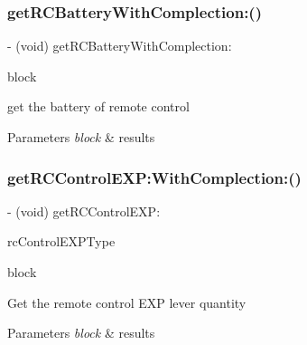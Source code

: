 \subsubsection{\texorpdfstring{get\+R\+C\+Battery\+With\+Complection\+:()}{getRCBatteryWithComplection:()}}
{\footnotesize\ttfamily -\/ (void) get\+R\+C\+Battery\+With\+Complection\+: \begin{DoxyParamCaption}\item[{(void($^\wedge$)(N\+S\+Integer battery, N\+S\+Error $\ast$\hyperlink{group___p_v_s_d_k___c_o_r_e___a_p_i___m_o_u_n_t_c_o_n_t_r_o_l_ga5a1de33b230662127568783314b4a54d}{\+\_\+\+Nullable} error))}]{block }\end{DoxyParamCaption}}

get the battery of remote control


\begin{DoxyParams}{Parameters}
{\em block} & results \\
\hline
\end{DoxyParams}
\mbox{\label{interface_p_v_remote_controller_ae939de42b3f4fbf4fe8f15f589a02d62}} 
\subsubsection{\texorpdfstring{get\+R\+C\+Control\+E\+X\+P\+:\+With\+Complection\+:()}{getRCControlEXP:WithComplection:()}}
{\footnotesize\ttfamily -\/ (void) get\+R\+C\+Control\+E\+X\+P\+: \begin{DoxyParamCaption}\item[{(P\+V\+R\+C\+Control\+E\+X\+P\+Type)}]{rc\+Control\+E\+X\+P\+Type }\item[{WithComplection:(void($^\wedge$)(float control\+Value, N\+S\+Error $\ast$\hyperlink{group___p_v_s_d_k___c_o_r_e___a_p_i___m_o_u_n_t_c_o_n_t_r_o_l_ga5a1de33b230662127568783314b4a54d}{\+\_\+\+Nullable} N\+S\+Error))}]{block }\end{DoxyParamCaption}}

Get the remote control E\+XP lever quantity


\begin{DoxyParams}{Parameters}
{\em block} & results \\
\hline
\end{DoxyParams}
\mbox{\label{interface_p_v_remote_controller_a5e7c79958273d5a1fda6fc46ffac3f15}} 
